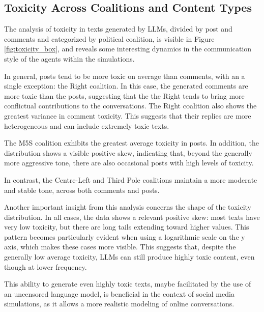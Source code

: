\subsection{Toxicity Across Coalitions and Content Types}
The analysis of toxicity in texts generated by LLMs, divided by post and comments and categorized by political coalition, is visible in Figure \ref{fig:toxicity_box}, and reveals some interesting dynamics in the communication style of the agents within the simulations.

In general, posts tend to be more toxic on average than comments, with an a single exception: the Right coalition.
In this case, the generated comments are more toxic than the posts, suggesting that the the Right tends to bring more conflictual contributions to the conversations.
The Right coalition also shows the greatest variance in comment toxicity.
This suggests that their replies are more heterogeneous and can include extremely toxic texts.

The M5S coalition exhibits the greatest average toxicity in posts.
In addition, the distribution shows a visible positive skew, indicating that, beyond the generally more aggressive tone, there are also occasional posts with high levels of toxicity.

In contrast, the Centre-Left and Third Pole coalitions maintain a more moderate and stable tone, across both comments and posts.

Another important insight from this analysis concerns the shape of the toxicity distribution.
In all cases, the data shows a relevant positive skew: most texts have very low toxicity, but there are long tails extending toward higher values.
This pattern becomes particularly evident when using a logarithmic scale on the y axis, which makes these cases more visible.
This suggests that, despite the generally low average toxicity, LLMs can still produce highly toxic content, even though at lower frequency.

This ability to generate even highly toxic texts, maybe facilitated by the use of an uncensored language model, is beneficial in the context of social media simulations, as it allows a more realistic modeling of online conversations.


